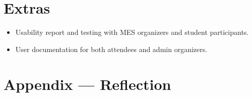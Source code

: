 \documentclass{article}
\begin{document}
\section{Extras}

\begin{itemize}
    \item Usability report and testing with MES organizers and student participants.
    \item User documentation for both attendees and admin organizers.
\end{itemize}

\newpage

\section*{Appendix --- Reflection}



\end{document}
